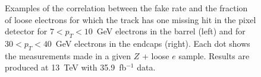 \begin{figure}[!h]
\begin{center}
\caption{
Examples of the correlation between the fake rate and the fraction of loose electrons 
for which the track has one missing hit in the pixel detector for  $7<p_T<10$~GeV electrons in the barrel (left) and for $30<p_T<40$~GeV electrons in the endcaps (right).
Each dot shows the measurements made in a given $Z$ + loose $e$ sample.
Results are produced at 13~TeV with 35.9~fb$^{-1}$ data.
}
\label{fig:FRvsNHits}
\end{center}
\end{figure}

